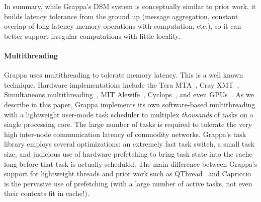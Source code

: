 In summary, while Grappa's DSM system is conceptually similar to prior work,
it builds latency tolerance from the ground up (message aggregation, constant
overlap of long latency memory operations with computation, etc.), so it can
better support irregular computations with little locality.




\paragraph{Multithreading} Grappa uses multithreading to tolerate memory
latency. This is a well known technique. Hardware implementations include the
Tera MTA~\cite{tera:mta1}, Cray XMT~\cite{feo:xmt}, Simultaneous
multithreading~\cite{tullsen:smt}, MIT Alewife~\cite{agarwal:alewife},
Cyclops~\cite{almasi:cyclops}, and even GPUs~\cite{gpus}. As we describe in
this paper, Grappa implements its own software-based multithreading with a
lightweight user-mode task scheduler to multiplex \emph{thousands\/} of tasks
on a single processing core. The large number of tasks is required to tolerate
the very high inter-node communication latency of commodity networks. Grappa's task
library employs several optimizations: an extremely fast task switch, a small
task size, and judicious use of hardware prefetching to bring task state into
the cache long before that task is actually scheduled. The main difference between Grappa's support for lightweight threads and prior work such as QThread~\cite{Wheeler08qthreads:an} and Capriccio~\cite{Behren03capriccio:scalable} is the pervasive use of prefetching (with a large number of active tasks, not even their contexts fit in cache!).


